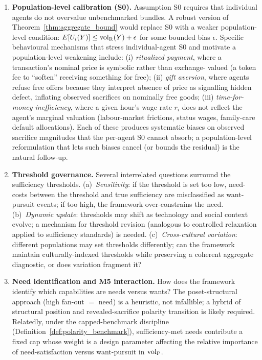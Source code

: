 \begin{enumerate}
\item \label{oq:calibration}
\textbf{Population-level calibration (S0).}
Assumption S0 requires that individual agents do not overvalue
unbenchmarked bundles.  A robust version of
Theorem~\ref{thm:aggregate_bound} would replace S0 with a weaker
population-level condition:
$E[U_i(Y)] \leq {\operatorname{vol}_{\mathrm{R}}}(Y) + \epsilon$ for some bounded bias
$\epsilon$.  Specific behavioural mechanisms that stress
individual-agent S0 and motivate a population-level
weakening include: (i) \emph{ritualized payment}, where a
transaction's nominal price is symbolic rather than exchange-
valued (a token fee to ``soften'' receiving something for free);
(ii) \emph{gift aversion}, where agents refuse free offers
because they interpret absence of price as signalling hidden
defect, inflating observed sacrifices on nominally free goods;
(iii) \emph{time-for-money inefficiency}, where a given hour's
wage rate $r_i$ does not reflect the agent's marginal valuation
(labour-market frictions, status wages, family-care default
allocations).  Each of these produces systematic biases on
observed sacrifice magnitudes that the per-agent S0 cannot
absorb; a population-level reformulation that lets such biases
cancel (or bounds the residual) is the natural follow-up.

\item \label{oq:threshold_governance}
\textbf{Threshold governance.}
Several interrelated questions surround the sufficiency thresholds.
(a)~\emph{Sensitivity}: if the threshold is set too low,
need-costs between the threshold and true sufficiency are
misclassified as want-pursuit events; if too high, the framework
over-constrains the need.
(b)~\emph{Dynamic update}: thresholds may shift as technology and
social context evolve; a mechanism for threshold revision
(analogous to controlled relaxation applied to sufficiency
standards) is needed.
(c)~\emph{Cross-cultural variation}: different populations may
set thresholds differently; can the framework maintain
culturally-indexed thresholds while preserving a coherent
aggregate diagnostic, or does variation fragment it?

\item \label{oq:need_identification}
\textbf{Need identification and M5 interaction.}
How does the framework identify which capabilities are needs
versus wants?  The poset-structural approach (high fan-out $=$
need) is a heuristic, not infallible; a hybrid of structural
position and revealed-sacrifice polarity transition is likely
required.  Relatedly, under the capped-benchmark discipline
(Definition~\ref{def:polarity_benchmark}), sufficiency-met needs
contribute a fixed cap whose weight is a design parameter
affecting the relative importance of need-satisfaction versus
want-pursuit in ${\operatorname{vol}_{\mathrm{P}}}$.


\end{enumerate}
